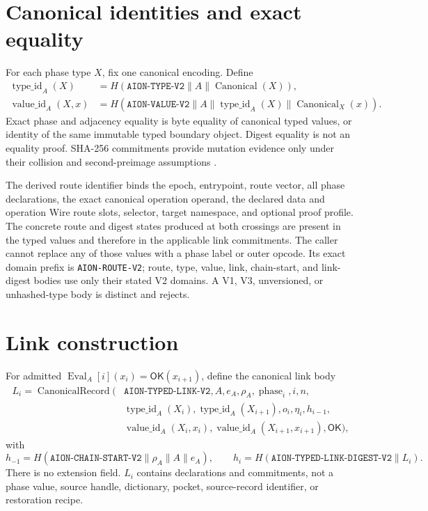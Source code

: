 \documentclass[11pt,letterpaper]{article}
\newcommand{\OK}{\mathsf{OK}}
\newcommand{\Canonical}{\operatorname{Canonical}}
\newcommand{\CanonicalRecord}{\operatorname{CanonicalRecord}}
\theoremstyle{definition}
\begin{document}
\section{Canonical identities and exact equality}

For each phase type $X$, fix one canonical encoding.  Define
\begin{align}
\operatorname{type\_id}_A(X)
 &=H(\mathtt{AION\mbox{-}TYPE\mbox{-}V2}\|A\|\Canonical(X)),\\
\operatorname{value\_id}_A(X,x)
 &=H(\mathtt{AION\mbox{-}VALUE\mbox{-}V2}\|A\|
   \operatorname{type\_id}_A(X)\|\Canonical_X(x)).
\end{align}
Exact phase and adjacency equality is byte equality of canonical typed values,
or identity of the same immutable typed boundary object.  Digest equality is
not an equality proof.  SHA-256 commitments provide mutation evidence only
under their collision and second-preimage assumptions \cite{fips1804}.

The derived route identifier binds the epoch, entrypoint, route vector, all
phase declarations, the exact canonical operation operand, the declared data
and operation Wire route slots, selector, target namespace, and optional proof
profile.  The concrete route and digest states produced at both crossings are
present in the typed values and therefore in the applicable link commitments.
The caller cannot replace any of those values with a phase label or outer opcode.
Its exact domain prefix is \texttt{AION-ROUTE-V2}; route, type, value, link,
chain-start, and link-digest bodies use only their stated V2 domains.  A V1,
V3, unversioned, or unhashed-type body is distinct and rejects.

\section{Link construction}

For admitted $\operatorname{Eval}_A[i](x_i)=\OK(x_{i+1})$, define the canonical
link body
\[
\begin{split}
L_i=\CanonicalRecord(&\mathtt{AION\mbox{-}TYPED\mbox{-}LINK\mbox{-}V2},A,
e_A,\rho_A,\operatorname{phase}_i,i,n,\\
&\operatorname{type\_id}_A(X_i),\operatorname{type\_id}_A(X_{i+1}),
o_i,\eta_i,h_{i-1},\\
&\operatorname{value\_id}_A(X_i,x_i),
\operatorname{value\_id}_A(X_{i+1},x_{i+1}),\OK),
\end{split}
\]
with
\[
h_{-1}=H(\mathtt{AION\mbox{-}CHAIN\mbox{-}START\mbox{-}V2}\|\rho_A\|A\|e_A),
\qquad
h_i=H(\mathtt{AION\mbox{-}TYPED\mbox{-}LINK\mbox{-}DIGEST\mbox{-}V2}\|L_i).
\]
There is no extension field.  $L_i$ contains declarations and commitments,
not a phase value, source handle, dictionary, pocket, source-record identifier,
or restoration recipe.
\end{document}
